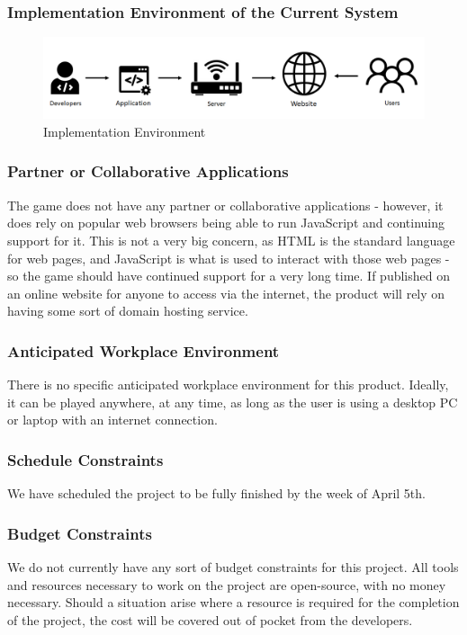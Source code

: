 \documentclass[12pt, titlepage]{article}
\begin{document}
\subsubsection{Implementation Environment of the Current System}
\begin{figure}[H]
\caption{Implementation Environment}
\centering
\includegraphics[width=0.95\linewidth]{environment.png}
\end{figure}

\subsubsection{Partner or Collaborative Applications}
The game does not have any partner or collaborative applications - however, it does rely on popular web browsers being able to run JavaScript and continuing support for it. This is not a very big concern, as HTML is the standard language for web pages, and JavaScript is what is used to interact with those web pages - so the game should have continued support for a very long time. If published on an online website for anyone to access via the internet, the product will rely on having some sort of domain hosting service.

\subsubsection{Anticipated Workplace Environment}
There is no specific anticipated workplace environment for this product. Ideally, it can be played anywhere, at any time, as long as the user is using a desktop PC or laptop with an internet connection.

\subsubsection{Schedule Constraints}

We have scheduled the project to be fully finished by the week of April 5th.
\subsubsection{Budget Constraints}
We do not currently have any sort of budget constraints for this project. All tools and resources necessary to work on the project are open-source, with no money necessary. Should a situation arise where a resource is required for the completion of the project, the cost will be covered out of pocket from the developers.
\end{document}
